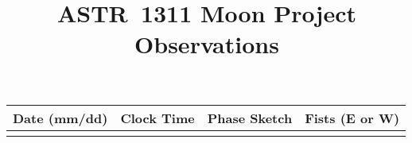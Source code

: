 \documentclass{article}
\title{ASTR~1311 Moon Project Observations}
\newcommand{\tikzcircle}{\begin{tikzpicture}\draw[black, line width=0.25mm] (0.5,0.5) circle (0.5); \end{tikzpicture}}
\begin{document}
\maketitle
\begin{tabular}{|c|c|c|c|}
\hline
Date (mm/dd) & Clock Time & Phase Sketch & Fists (E or W)\\
\hline
             &            & \tikzcircle & \\
\hline
\end{tabular}
\end{document}
